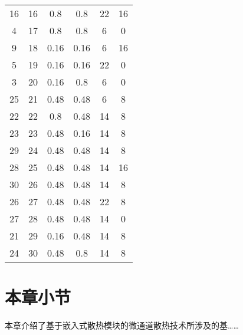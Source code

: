 \begin{longtable}{@{\extracolsep{\fill}}cccccc@{}}
    16  & 16  & 0.8             & 0.8            & 22       & 16       \\
    4   & 17  & 0.8             & 0.8            & 6        & 0        \\
    9   & 18  & 0.16            & 0.16           & 6        & 16       \\
    5   & 19  & 0.16            & 0.16           & 22       & 0        \\
    3   & 20  & 0.16            & 0.8            & 6        & 0        \\
    25  & 21  & 0.48            & 0.48           & 6        & 8        \\
    22  & 22  & 0.8             & 0.48           & 14       & 8        \\
    23  & 23  & 0.48            & 0.16           & 14       & 8        \\
    29  & 24  & 0.48            & 0.48           & 14       & 8        \\
    28  & 25  & 0.48            & 0.48           & 14       & 16       \\
    30  & 26  & 0.48            & 0.48           & 14       & 8        \\
    26  & 27  & 0.48            & 0.48           & 22       & 8        \\
    27  & 28  & 0.48            & 0.48           & 14       & 0        \\
    21  & 29  & 0.16            & 0.48           & 14       & 8        \\
    24  & 30  & 0.48            & 0.8            & 14       & 8        \\ \bottomrule
\end{longtable}

\section{本章小节}
本章介绍了基于嵌入式散热模块的微通道散热技术所涉及的基……